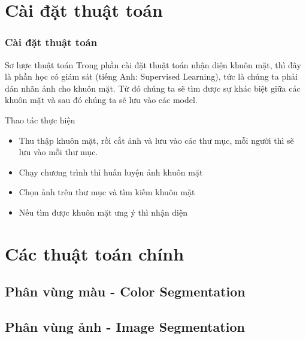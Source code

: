 \documentclass[10.5pt]{beamer}
\begin{document}
\section{\fontsize{8.5pt}{9.5pt}\selectfont Cài đặt thuật toán}
\begin{frame}
	\frametitle{\fontsize{11.5pt}{12.5pt}\selectfont Cài đặt thuật toán}
		\begin{block}{\fontsize{10pt}{12.5pt}\selectfont Sơ lược thuật toán}
			\fontsize{8.5pt}{11.5pt}\selectfont Trong phần cài đặt thuật toán nhận diện khuôn mặt, thì đây là phần học có giám sát (tiếng Anh: Supervised Learning), tức là chúng ta phải dán nhãn ảnh cho khuôn mặt. Từ đó chúng ta sẽ tìm được sự khác biệt giữa các khuôn mặt và sau đó chúng ta sẽ lưu vào các model.
		\end{block}
		\begin{block}{\fontsize{10pt}{10.5pt}\selectfont Thao tác thực hiện}
			\begin{itemize}
				\fontsize{8.5pt}{10.5pt}\selectfont
				\item Thu thập khuôn mặt, rồi cắt ảnh và lưu vào các thư mục, mỗi người thì sẽ lưu vào mỗi thư mục.
				\item Chạy chương trình thì huấn luyện ảnh khuôn mặt
				\item Chọn ảnh trên thư mục và tìm kiếm khuôn mặt
				\item Nếu tìm được khuôn mặt ưng ý thì nhận diện
			\end{itemize}
		\end{block}
\end{frame}

\section{\fontsize{8.5pt}{9.5pt}\selectfont Các thuật toán chính}
\subsection{\fontsize{8.5pt}{9.5pt}\selectfont Phân vùng màu - Color Segmentation}
\subsection{\fontsize{8.5pt}{9.5pt}\selectfont Phân vùng ảnh - Image Segmentation}
\end{document}
